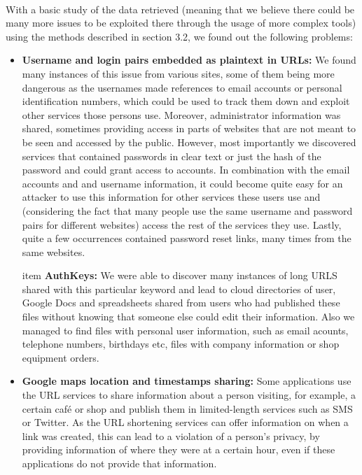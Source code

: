 \documentclass[12pt]{article}
\begin{document}
\paragraph{}
With a basic study of the data retrieved (meaning that we believe there could be many more issues to be exploited there through the usage of more complex tools) using the methods described in section 3.2, we found out the following problems:

\begin{itemize}

\item \textbf{Username and login pairs embedded as plaintext in URLs:} We found many instances of this issue from various sites, some of them being more dangerous as the usernames made references to email accounts or personal identification numbers, which could be used to track them down and exploit other services those persons use. Moreover, administrator information was shared, sometimes providing access in parts of websites that are not meant to be seen and accessed by the public. However, most importantly we discovered services that contained passwords in clear text or just the hash of the password and could grant access to accounts. In combination with the email accounts and and username information, it could become quite easy for an attacker to use this information for other services these users use and (considering the fact that many people use the same username and password pairs for different websites) access the rest of the services they use. Lastly, quite a few occurrences contained password reset links, many times from the same websites.

item \textbf{AuthKeys:} We were able to discover many instances of long URLS shared with this particular keyword and lead to cloud directories of user, Google Docs and spreadsheets shared from users who had published these files without knowing that someone else could edit their information. Also we managed to find files with personal user information, such as email acounts, telephone numbers, birthdays etc, files with company information or shop equipment orders.

\item \textbf{Google maps location and timestamps sharing:} Some applications use the URL services to share information about a person visiting, for example, a certain café or shop and publish them in limited-length services such as SMS or Twitter. As the URL shortening services can offer information on when a link was created, this can lead to a violation of a person's privacy, by providing information of where they were at a certain hour, even if these applications do not provide that information.


\end{itemize}
\end{document}
